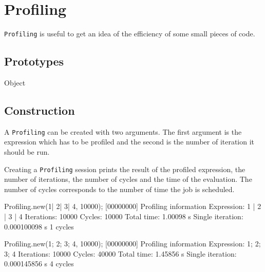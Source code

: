 \section{Profiling}

\lstinline|Profiling| is useful to get an idea of the efficiency of some
small pieces of code.

\subsection{Prototypes}

\begin{refObjects}
\item[Object]
\end{refObjects}

\subsection{Construction}

A \lstinline|Profiling| can be created with two arguments.  The first
argument is the expression which has to be profiled and the second is the
number of iteration it should be run.

Creating a \lstinline|Profiling| session prints the result of the profiled
expression, the number of iterations, the number of cycles and the time of
the evaluation.  The number of cycles corresponds to the number of time the
job is scheduled.

\begin{urbiunchecked}[firstnumber=1]
Profiling.new({1| 2| 3| 4}, 10000);
[00000000] Profiling information
  Expression:       1 | 2 | 3 | 4
  Iterations:       10000
  Cycles:           10000
  Total time:       1.00098 s
  Single iteration: 0.000100098 s
                    1 cycles


Profiling.new({1; 2; 3; 4}, 10000);
[00000000] Profiling information
  Expression:       1;
2;
3;
4
  Iterations:       10000
  Cycles:           40000
  Total time:       1.45856 s
  Single iteration: 0.000145856 s
                    4 cycles
\end{urbiunchecked}




